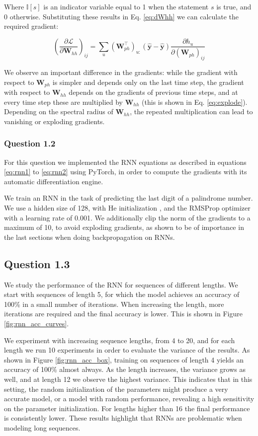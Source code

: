 \documentclass{article}
\newcommand{\pd}[2]{\frac{\partial #1}{\partial #2}}
\begin{document}
Where $\mathbb{I}[s]$ is an indicator variable equal to 1 when the statement $s$ is true, and 0 otherwise. Substituting these results in Eq. \ref{eq:dWhh} we can calculate the required gradient:

\begin{equation}
\left(\pd{\mathcal{L}}{\mathbf{W}_{hh}}\right)_{ij} = \sum_u(\mathbf{W}_{ph}^\top)_{u:}(\hat{\mathbf{y}} - \hat{\mathbf{y}})\pd{h_u}{(\mathbf{W}_{ph})_{ij}}
\end{equation}

We observe an important difference in the gradients: while the gradient with respect to $\mathbf{W}_{ph}$ is simpler and depends only on the last time step, the gradient with respect to $\mathbf{W}_{hh}$ depends on the gradients of previous time steps, and at every time step these are multiplied by $\mathbf{W}_{hh}$ (this is shown in Eq. \ref{eq:explode}). Depending on the spectral radius of $\mathbf{W}_{hh}$, the repeated multiplication can lead to vanishing or exploding gradients.

\subsubsection*{Question 1.2}

For this question we implemented the RNN equations as described in equations \ref{eq:rnn1} to \ref{eq:rnn2} using PyTorch, in order to compute the gradients with its automatic differentiation engine. 

We train an RNN in the task of predicting the last digit of a palindrome number. We use a hidden size of 128, with He initialization \cite{he2015delving}, and the RMSProp optimizer with a learning rate of 0.001. We additionally clip the norm of the gradients to a maximum of 10, to avoid exploding gradients, as shown to be of importance in the last sections when doing backpropagation on RNNs.

\subsection*{Question 1.3}

We study the performance of the RNN for sequences of different lengths. We start with sequences of length 5, for which the model achieves an accuracy of 100\% in a small number of iterations. When increasing the length, more iterations are required and the final accuracy is lower. This is shown in Figure \ref{fig:rnn_acc_curves}.

We experiment with increasing sequence lengths, from 4 to 20, and for each length we run 10 experiments in order to evaluate the variance of the results. As shown in Figure \ref{fig:rnn_acc_box}, training on sequences of length 4 yields an accuracy of 100\% almost always. As the length increases, the variance grows as well, and at length 12 we observe the highest variance. This indicates that in this setting, the random initialization of the parameters might produce a very accurate model, or a model with random performance, revealing a high sensitivity on the parameter initialization. For lengths higher than 16 the final performance is consistently lower. These results highlight that RNNs are problematic when modeling long sequences.
\end{document}
